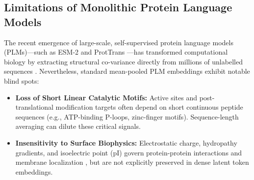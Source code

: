 \documentclass[journal]{IEEEtran}
\begin{document}
\subsection{Limitations of Monolithic Protein Language Models}
The recent emergence of large-scale, self-supervised protein language models (PLMs)---such as ESM-2 \cite{lin2023evolutionary} and ProtTrans \cite{elnaggar2021prottrans}---has transformed computational biology by extracting structural co-variance directly from millions of unlabelled sequences \cite{rives2021biological}. Nevertheless, standard mean-pooled PLM embeddings exhibit notable blind spots:
\begin{itemize}
    \item \textbf{Loss of Short Linear Catalytic Motifs:} Active sites and post-translational modification targets often depend on short continuous peptide sequences (e.g., ATP-binding P-loops, zinc-finger motifs). Sequence-length averaging can dilute these critical signals.
    \item \textbf{Insensitivity to Surface Biophysics:} Electrostatic charge, hydropathy gradients, and isoelectric point ($\text{pI}$) govern protein-protein interactions and membrane localization \cite{kulmanov2018deepgoplus}, but are not explicitly preserved in dense latent token embeddings.
\end{itemize}
\end{document}
